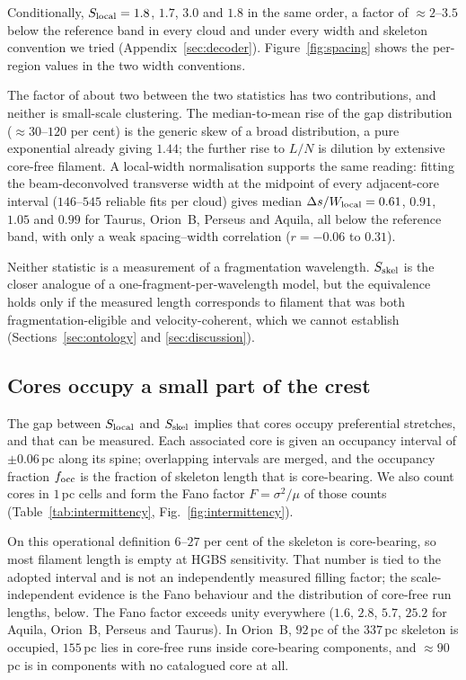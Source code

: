 \documentclass[usenatbib,twoside,twocolumn]{mnras}
\begin{document}
Conditionally, $S_{\rm local}=1.8$, $1.7$, $3.0$ and $1.8$ in the same order, a factor of $\approx2$--$3.5$ below the reference band in every cloud and under every width and skeleton convention we tried (Appendix~\ref{sec:decoder}). Figure~\ref{fig:spacing} shows the per-region values in the two width conventions.

The factor of about two between the two statistics has two contributions, and neither is small-scale clustering. The median-to-mean rise of the gap distribution ($\approx30$--$120$ per cent) is the generic skew of a broad distribution, a pure exponential already giving $1.44$; the further rise to $L/N$ is dilution by extensive core-free filament. A local-width normalisation supports the same reading: fitting the beam-deconvolved transverse width at the midpoint of every adjacent-core interval ($146$--$545$ reliable fits per cloud) gives median $\Delta s/W_{\rm local}=0.61$, $0.91$, $1.05$ and $0.99$ for Taurus, Orion~B, Perseus and Aquila, all below the reference band, with only a weak spacing--width correlation ($r=-0.06$ to $0.31$).

Neither statistic is a measurement of a fragmentation wavelength. $S_{\rm skel}$ is the closer analogue of a one-fragment-per-wavelength model, but the equivalence holds only if the measured length corresponds to filament that was both fragmentation-eligible and velocity-coherent, which we cannot establish (Sections~\ref{sec:ontology} and \ref{sec:discussion}).

\subsection{Cores occupy a small part of the crest}
\label{sec:occupancy}


The gap between $S_{\rm local}$ and $S_{\rm skel}$ implies that cores occupy preferential stretches, and that can be measured. Each associated core is given an occupancy interval of $\pm0.06$\,pc along its spine; overlapping intervals are merged, and the occupancy fraction $f_{\rm occ}$ is the fraction of skeleton length that is core-bearing. We also count cores in $1$\,pc cells and form the Fano factor $F=\sigma^2/\mu$ of those counts (Table~\ref{tab:intermittency}, Fig.~\ref{fig:intermittency}).

On this operational definition $6$--$27$ per cent of the skeleton is core-bearing, so most filament length is empty at HGBS sensitivity. That number is tied to the adopted interval and is not an independently measured filling factor; the scale-independent evidence is the Fano behaviour and the distribution of core-free run lengths, below. The Fano factor exceeds unity everywhere ($1.6$, $2.8$, $5.7$, $25.2$ for Aquila, Orion~B, Perseus and Taurus). In Orion~B, $92$\,pc of the $337$\,pc skeleton is occupied, $155$\,pc lies in core-free runs inside core-bearing components, and $\approx90$\,pc is in components with no catalogued core at all.
\end{document}
